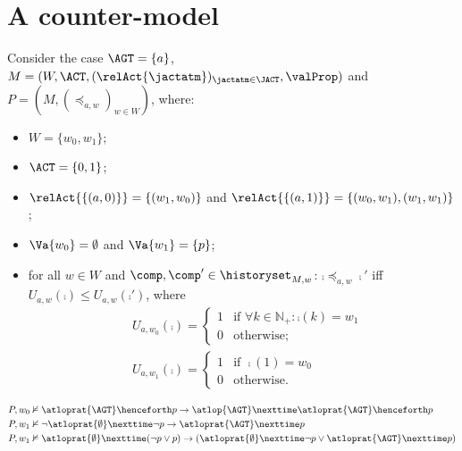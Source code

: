\section{A counter-model}\label{section: a counter-model}
  Consider the case $\AGT = \{a\}$, $M = ( W,  \ACT,  (\relAct{\jactatm})_{\jactatm \in \JACT}, \valProp)$ and $P = ( M, (\preceq_{a,w})_{w \in W })$, where:
  \begin{itemize}
    \item $W=\{w_0,w_1\}$;
    \item $\ACT=\{0,1\}$;
    \item $\relAct{\{(a,0)\}}=\{(w_1,w_0)\}$ and $\relAct{\{(a,1)\}}=\{(w_0,w_1),(w_1,w_1)\}$;
    \item $\Va{w_0}=\emptyset $ and $\Va{w_1}=\{p\} $;
    \item for all $w\in W$ and $\comp, \comp' \in \historyset_{M,w}$: $\comp \preceq_{a,w} \comp' $ iff $\mathit{U}_{a,w}(\comp) \leq \mathit{U}_{a,w}(\comp')$, where 
    \begin{align*}
& \mathit{U}_{a,w_0 }(\comp)= 
\begin{cases}
1 & \text{if }   \forall k\in \mathbb{N}_+: \comp(k)=w_1\\
0 &  \text{otherwise};
\end{cases}\\
& \mathit{U}_{a,w_1 }(\comp)= 
\begin{cases}
  1 & \text{if }  \comp(1)=w_0\\
  0 &  \text{otherwise}.
\end{cases}
      \end{align*}
  \end{itemize}
  \begin{fact}
    \begin{align*}
    & P,w_0\nvDash \atloprat{\AGT }\henceforth p\to \atlop{\AGT }\nexttime\atloprat{\AGT }\henceforth p\\
    & P,w_1\nvDash \neg \atloprat{\emptyset }\nexttime \neg p \to \atloprat{\AGT}\nexttime p \\
    & P,w_1\nvDash \atloprat{\emptyset } \nexttime (\neg p \lor p) \rightarrow (\atloprat{\emptyset } \nexttime \neg p \lor \atloprat{\AGT} \nexttime p) 
    \end{align*}
  \end{fact}
